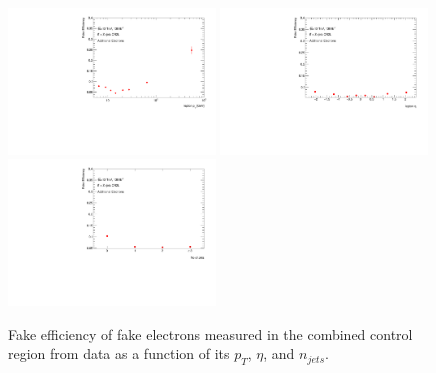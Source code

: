 \begin{figure}[!htb]
        \begin{center}
        \includegraphics[width = 0.49\textwidth]{figures/Analysis/Background/Fake_Eff_Elec_pt_1D.pdf}
        \includegraphics[width = 0.49\textwidth]{figures/Analysis/Background/Fake_Eff_Elec_eta_1D.pdf}\\
        \includegraphics[width = 0.49\textwidth]{figures/Analysis/Background/Fake_Eff_Elec_jet_n_1D.pdf} 
        \end{center}
    \caption{Fake efficiency of fake electrons measured in the combined control region from data as a function of its $p_{T}$, $\eta$, and $n_{jets}$.\label{fig:FakeEff_1D_Electron}}
\end{figure}

